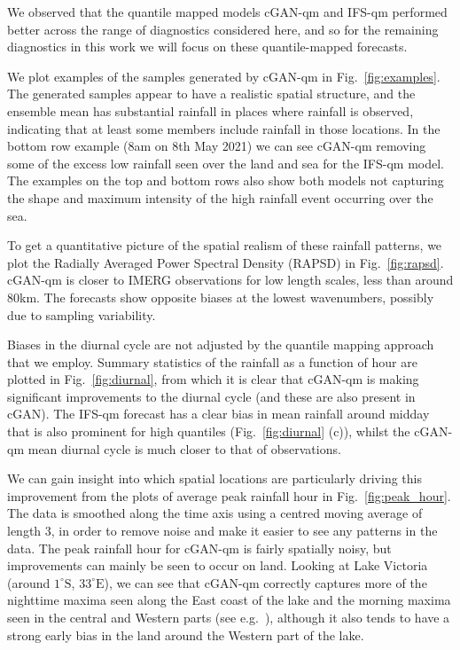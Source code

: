 \documentclass{article}
\begin{document}
We observed that the quantile mapped models cGAN-qm and IFS-qm performed better across the range of diagnostics considered here, and so for the remaining diagnostics in this work we will focus on these quantile-mapped forecasts.

We plot examples of the samples generated by cGAN-qm in Fig.~\ref{fig:examples}. The generated samples appear to have a realistic spatial structure, and the ensemble mean has substantial rainfall in places where rainfall is observed, indicating that at least some members include rainfall in those locations. In the bottom row example (8am on 8th May 2021) we can see cGAN-qm removing some of the excess low rainfall seen over the land and sea for the IFS-qm model. The examples on the top and bottom rows also show both models not capturing the shape and maximum intensity of the high rainfall event occurring over the sea. 

To get a quantitative picture of the spatial realism of these rainfall patterns, we plot the Radially Averaged Power Spectral Density (RAPSD) in Fig.~\ref{fig:rapsd}. cGAN-qm is closer to IMERG observations for low length scales, less than around 80km. The forecasts show opposite biases at the lowest wavenumbers, possibly due to sampling variability.

Biases in the diurnal cycle are not adjusted by the quantile mapping approach that we employ. Summary statistics of the rainfall as a function of hour are plotted in Fig.~\ref{fig:diurnal}, from which it is clear that cGAN-qm is making significant improvements to the diurnal cycle (and these are also present in cGAN). The IFS-qm forecast has a clear bias in mean rainfall around midday that is also prominent for high quantiles (Fig.~\ref{fig:diurnal} (c)), whilst the cGAN-qm mean diurnal cycle is much closer to that of observations. 

We can gain insight into which spatial locations are particularly driving this improvement from the plots of average peak rainfall hour in Fig.~\ref{fig:peak_hour}. The data is smoothed along the time axis using a centred moving average of length 3, in order to remove noise and make it easier to see any patterns in the data. The peak rainfall hour for cGAN-qm is fairly spatially noisy, but improvements can mainly be seen to occur on land. Looking at Lake Victoria (around $1^{\circ}\text{S}
$, $33^{\circ}\text{E}$), we can see that cGAN-qm correctly captures more of the nighttime maxima seen along the East coast of the lake and the morning maxima seen in the central and Western parts (see e.g.~\cite{woodhams_identifying_2019}), although it also tends to have a strong early bias in the land around the Western part of the lake.
\end{document}
